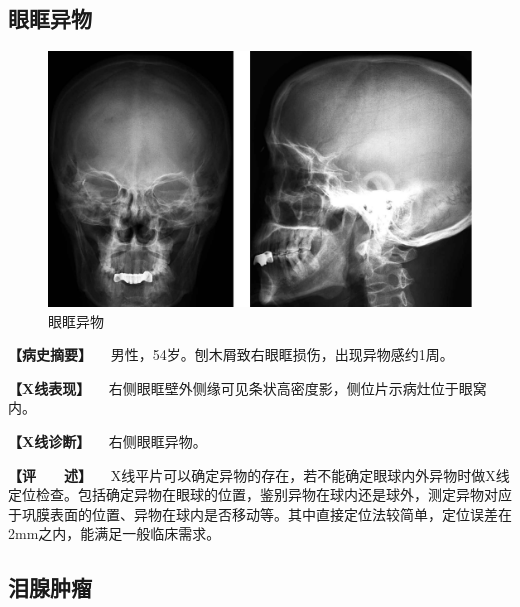 \subsection{眼眶异物}

\begin{figure}[!htbp]
 \centering
 \includegraphics{./images/Image00421.jpg}
 \captionsetup{justification=centering}
 \caption{眼眶异物}
 \label{fig7-2-5}
  \end{figure} 

\textbf{【病史摘要】}
　男性，54岁。刨木屑致右眼眶损伤，出现异物感约1周。

\textbf{【X线表现】}
　右侧眼眶壁外侧缘可见条状高密度影，侧位片示病灶位于眼窝内。

\textbf{【X线诊断】} 　右侧眼眶异物。

\textbf{【评　　述】}
　X线平片可以确定异物的存在，若不能确定眼球内外异物时做X线定位检查。包括确定异物在眼球的位置，鉴别异物在球内还是球外，测定异物对应于巩膜表面的位置、异物在球内是否移动等。其中直接定位法较简单，定位误差在2mm之内，能满足一般临床需求。

\subsection{泪腺肿瘤}

